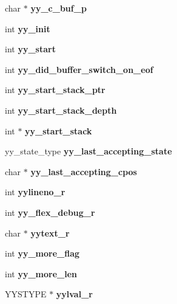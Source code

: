 \begin{DoxyCompactItemize}
\item 
char $\ast$ {\bfseries yy\-\_\-c\-\_\-buf\-\_\-p}\label{structyyguts__t_ab1b9bcacb33aab1e02b625512bc0e221}

\item 
int {\bfseries yy\-\_\-init}\label{structyyguts__t_abbef56b2d8359f6a15629c104f5dd030}

\item 
int {\bfseries yy\-\_\-start}\label{structyyguts__t_a8baf7d47fe53035d9bc2a9670795ff01}

\item 
int {\bfseries yy\-\_\-did\-\_\-buffer\-\_\-switch\-\_\-on\-\_\-eof}\label{structyyguts__t_a2daec411627700709ef2fd927e69627d}

\item 
int {\bfseries yy\-\_\-start\-\_\-stack\-\_\-ptr}\label{structyyguts__t_ad9e132dacc2904a8ae76c64c72e33795}

\item 
int {\bfseries yy\-\_\-start\-\_\-stack\-\_\-depth}\label{structyyguts__t_a35bedf1c17debd766565b99c39132eb4}

\item 
int $\ast$ {\bfseries yy\-\_\-start\-\_\-stack}\label{structyyguts__t_af6e2e45a5fdba0f313c680b35da4292a}

\item 
yy\-\_\-state\-\_\-type {\bfseries yy\-\_\-last\-\_\-accepting\-\_\-state}\label{structyyguts__t_a84e01a3658729e9d69f79feb3faf1c99}

\item 
char $\ast$ {\bfseries yy\-\_\-last\-\_\-accepting\-\_\-cpos}\label{structyyguts__t_a46fb8d232ed375921af0b37caeeb67c4}

\item 
int {\bfseries yylineno\-\_\-r}\label{structyyguts__t_aa9f13776b8d311e847cc7d974d49af4c}

\item 
int {\bfseries yy\-\_\-flex\-\_\-debug\-\_\-r}\label{structyyguts__t_a5ad72d75ed6d693824fe7e02ce21118e}

\item 
char $\ast$ {\bfseries yytext\-\_\-r}\label{structyyguts__t_aebaa731ad6cbe2411d104925e5bb3f2c}

\item 
int {\bfseries yy\-\_\-more\-\_\-flag}\label{structyyguts__t_a664a72171cc3e720fcb8120af9b72883}

\item 
int {\bfseries yy\-\_\-more\-\_\-len}\label{structyyguts__t_a683563bf4cd73f25b4c7b78579c1330e}

\item 
\-Y\-Y\-S\-T\-Y\-P\-E $\ast$ {\bfseries yylval\-\_\-r}\label{structyyguts__t_a55dbdcd46a36d34adcbfc29be44d10cf}

\end{DoxyCompactItemize}


